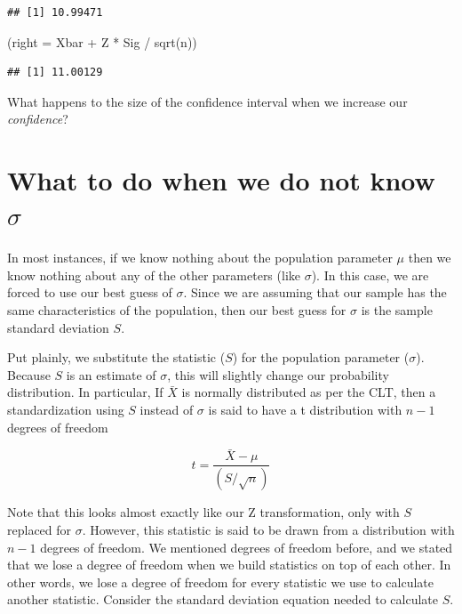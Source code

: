 \documentclass[
]{book}
\newenvironment{Shaded}{\begin{snugshade}}{\end{snugshade}}
\newcommand{\AttributeTok}[1]{\textcolor[rgb]{0.77,0.63,0.00}{#1}}
\newcommand{\FunctionTok}[1]{\textcolor[rgb]{0.00,0.00,0.00}{#1}}
\newcommand{\NormalTok}[1]{#1}
\newcommand{\SpecialCharTok}[1]{\textcolor[rgb]{0.00,0.00,0.00}{#1}}
\begin{document}
\begin{verbatim}
## [1] 10.99471
\end{verbatim}

\begin{Shaded}
\begin{Highlighting}[]
\NormalTok{(}\AttributeTok{right =}\NormalTok{ Xbar }\SpecialCharTok{+}\NormalTok{ Z }\SpecialCharTok{*}\NormalTok{ Sig }\SpecialCharTok{/} \FunctionTok{sqrt}\NormalTok{(n))}
\end{Highlighting}
\end{Shaded}

\begin{verbatim}
## [1] 11.00129
\end{verbatim}

What happens to the size of the confidence interval when we increase our \emph{confidence}?

\hypertarget{what-to-do-when-we-do-not-know-sigma}{%
\section{\texorpdfstring{What to do when we do not know \(\sigma\)}{What to do when we do not know \textbackslash sigma}}\label{what-to-do-when-we-do-not-know-sigma}}

In most instances, if we know nothing about the population parameter \(\mu\) then we know nothing about any of the other parameters (like \(\sigma\)). In this case, we are forced to use our best guess of \(\sigma\). Since we are assuming that our sample has the same characteristics of the population, then our best guess for \(\sigma\) is the sample standard deviation \(S\).

Put plainly, we substitute the statistic (\(S\)) for the population parameter (\(\sigma\)). Because \(S\) is an estimate of \(\sigma\), this will slightly change our probability distribution. In particular, If \(\bar{X}\) is normally distributed as per the CLT, then a standardization using \(S\) instead of \(\sigma\) is said to have a t distribution with \(n-1\) degrees of freedom

\[t=\frac{\bar{X}-\mu}{(S/\sqrt{n})}\]

Note that this looks almost exactly like our Z transformation, only with \(S\) replaced for \(\sigma\). However, this statistic is said to be drawn from a distribution with \(n-1\) degrees of freedom. We mentioned degrees of freedom before, and we stated that we lose a degree of freedom when we build statistics on top of each other. In other words, we lose a degree of freedom for every statistic we use to calculate another statistic. Consider the standard deviation equation needed to calculate \(S\).
\end{document}

